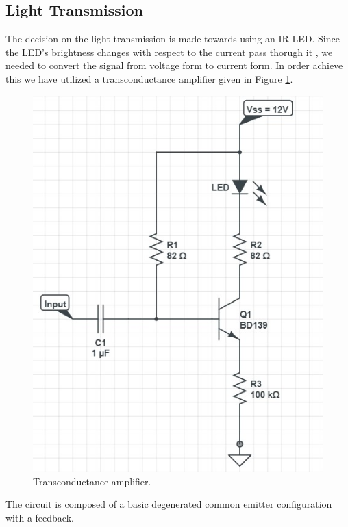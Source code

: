 \documentclass[a4paper,10pt]{IEEEtran}
\begin{document}
\subsection{Light Transmission}
The decision on the light transmission is made towards using an IR LED. Since the LED's brightness changes with respect to the current pass thorugh it , we needed to convert the signal from voltage form to current form. In order achieve this we have utilized a transconductance amplifier given in Figure \ref{transconductance}. 
\begin{figure}[htbp!]
    \centering
    \includegraphics[width = 1\linewidth]{Led Driver Circuit.jpg}
    \caption{Transconductance amplifier.}
    \label{transconductance}
\end{figure} 
The circuit is composed of a basic degenerated common emitter configuration with a feedback. 
\end{document}
